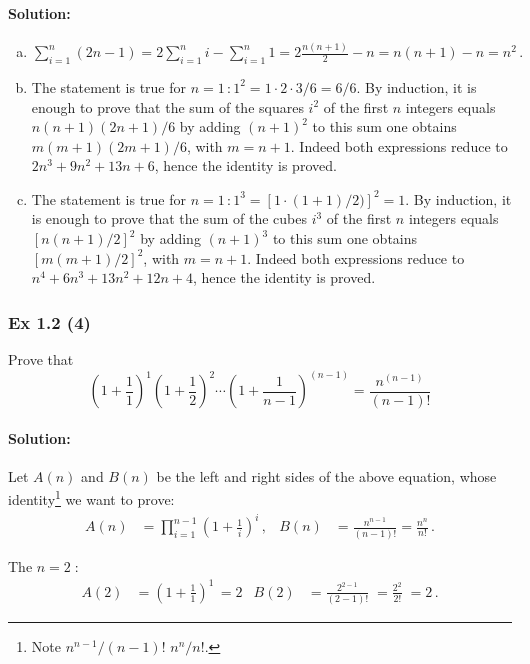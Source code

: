{%
%
\paragraph{Solution:}{
\begin{enumerate}[(a)]
\item $\sum_{i=1}^{n} (2n-1) = 2 \sum_{i=1}^{n} i - \sum_{i=1}^{n} 1 = 2 \frac{n(n+1)}{2} - n = n(n+1) - n = n^2\,.$ 
\item The statement is true for $n = 1\,: 1^2 = 1 \cdot 2 \cdot 3/6 = 6/6$. By induction, it is enough to prove that  the sum of the squares $i^2$ of the first $n$ integers equals $n (n+1)(2n + 1)/6$  by adding $(n+1)^2$ to this sum one obtains $m (m+1)(2m + 1)/6$, with $m=n+1$. Indeed both expressions reduce to $2 n^3 + 9 n^2 + 13 n + 6$, hence the identity is proved.
\item The statement is true for $n = 1\,: 1^3 = [1\cdot(1+1)/2)]^2 = 1$. By induction, it is enough to prove that  the sum of the cubes $i^3$ of the first $n$ integers equals $[n (n+1)/2]^2$  by adding $(n+1)^3$ to this sum one obtains $[m (m+1)/2]^2$, with $m=n+1$. Indeed both expressions reduce to $n^4+ 6 n^3 + 13 n^2 + 12 n + 4$, hence the identity is proved.
\end{enumerate}
}

\subsubsection{Ex 1.2 (4)}\label{sec:Ex_1.2.4}
Prove that 
$$ \left( 1 + \frac{1}{1} \right)^1 \left( 1 + \frac{1}{2} \right)^2 \cdots {\left( 1 + \frac{1}{n-1} \right)}^{(n-1)} = \frac{n^{(n-1)}}{(n-1)!} $$
%
%
\paragraph{Solution:}{
Let $A(n)$ and $B(n)$ be the left and right sides of the above equation, 
whose identity\footnote{Note $n^{n-1}/(n-1)!$  $n^n / n!$.} 
we want to prove:
\begin{align*}
A(n) &= \prod_{i=1}^{n-1} \left( 1 + \frac{1}{i} \right)^i\,, &B(n) &= \frac{n^{n-1}}{(n-1)!} = \frac{n^n}{n!}\,.
\end{align*}

The   $n=2\;$: 
\begin{align*}
A(2) &= \left( 1 + \frac{1}{1} \right)^1\,= 2 &B(2) &= \frac{2^{2-1}}{(2-1)!} \;= \frac{2^2}{2!} \;= 2 \,.
\end{align*}

}}
